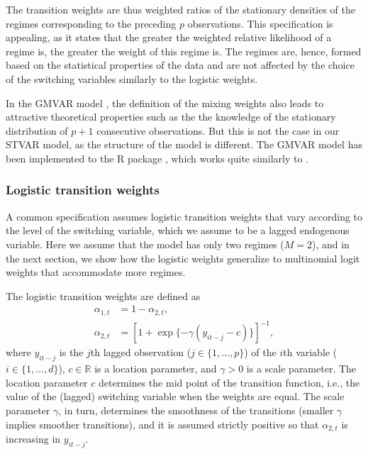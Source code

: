 \documentclass[nojss]{jss}
\begin{document}
The transition weights are thus weighted ratios of the stationary densities of the regimes corresponding to the preceding $p$ observations. This specification is appealing, as it states that the greater the weighted relative likelihood of a regime is, the greater the weight of this regime is. The regimes are, hence, formed based on the statistical properties of the data and are not affected by the choice of the switching variables similarly to the logistic weights.

In the GMVAR model \citep{Kalliovirta+Meitz+Saikkonen:2016}, the definition of the mixing weights also leads to attractive theoretical properties such as the the knowledge of the stationary distribution of $p+1$ consecutive observations. But this is not the case in our STVAR model, as the structure of the model is different. The GMVAR model has been implemented to the R package  \citep{gmvarkit}, which works quite similarly to .

\subsubsection{Logistic transition weights}\label{sec:logistic_weights}
A common specification assumes logistic transition weights \citep[e.g.,][]{Anderson+Vahid:1998} that vary according to the level of the switching variable, which we assume to be a lagged endogenous variable. Here we assume that the model has only two regimes ($M=2$), and in the next section, we show how the logistic weights generalize to multinomial logit weights that accommodate more regimes.

The logistic transition weights are defined as
\begin{align}
\alpha_{1,t} &= 1 - \alpha_{2,t},\\
\alpha_{2,t} &= [1 + \exp\lbrace -\gamma(y_{it-j} - c)\rbrace ]^{-1},
\end{align}
where $y_{it-j}$ is the $j$th lagged observation ($j\in \lbrace 1,...,p \rbrace$) of the $i$th variable ($i\in \lbrace 1,...,d \rbrace$), $c\in\mathbb{R}$ is a location parameter, and $\gamma > 0$ is a scale parameter. The location parameter $c$ determines the mid point of the transition function, i.e., the value of the (lagged) switching variable when the weights are equal. The scale parameter $\gamma$, in turn,  determines the smoothness of the transitions (smaller $\gamma$ implies smoother transitions), and it is assumed strictly positive so that $\alpha_{2,t}$ is increasing in $y_{it-j}$.
\end{document}
